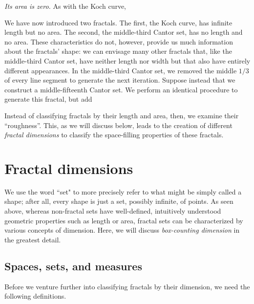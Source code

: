 \begin{myobs}\textit{Its area is zero.} As with the Koch curve, \end{myobs}


We have now introduced two fractals. The first, the Koch curve, has infinite length but no area. The second, the middle-third Cantor set, has no length and no area. These characteristics do not, however, provide us much information about the fractals' shape: we can envisage many other fractals that, like the middle-third Cantor set, have neither length nor width but that also have entirely different appearances. In the middle-third Cantor set, we removed the middle $1/3$ of every line segment to generate the next iteration. Suppose instead that we construct a middle-fifteenth Cantor set. We perform an identical procedure to generate this fractal, but add




Instead of classifying fractals by their length and area, then, we examine their ``roughness''. This, as we will discuss below, leads to the creation of different \textit{fractal dimensions} to classify the space-filling properties of these fractals.














\section{Fractal dimensions}

We use the word ``set" to more precisely refer to what might be simply called a shape; after all, every shape is just a set, possibly infinite, of points. As seen above, whereas non-fractal sets have well-defined, intuitively understood geometric properties such as length or area, fractal sets can be characterized by various concepts of dimension. Here, we will discuss \textit{box-counting dimension} in the greatest detail.

\subsection{Spaces, sets, and measures}

Before we venture further into classifying fractals by their dimension, we need the following definitions.

